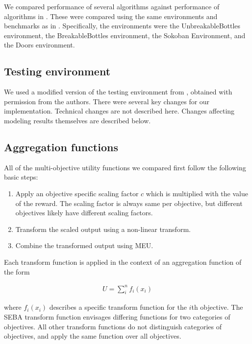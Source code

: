 We compared performance of several algorithms against performance of algorithms in \cite{vamplew_potential-based_2021}. These were compared using the same environments and benchmarks as in \cite{vamplew_potential-based_2021}. Specifically, the environments were the UnbreakableBottles environment, the BreakableBottles environment, the Sokoban Environment, and the Doors environment.
\subsection{Testing environment}

We used a modified version of the testing environment from \cite{vamplew_potential-based_2021}, obtained with permission from the authors. There were several key changes for our implementation. Technical changes are not described here. Changes affecting modeling results themselves are described below.



\subsection{Aggregation functions}



All of the multi-objective utility functions we compared first follow the following basic steps:
\begin{enumerate}

    \item Apply an objective specific scaling factor $c$ which is multiplied with the value of the reward. The scaling factor is always same per objective, but different objectives likely have different scaling factors.
    \item Transform the scaled output using a non-linear transform. %
    \item Combine the transformed output using MEU.
\end{enumerate}

Each transform function is applied in the context of an aggregation function of the form

\begin{align}
\label{eq:meu}
U=\sum_{i}^n{f_i(x_i)}
\end{align}

\noindent where ${f_i(x_i)}$ describes a specific transform function for the $i$th objective. The SEBA transform function envisages differing functions for two categories of objectives. All other transform functions do not distinguish categories of objectives, and apply the same function over all objectives.


